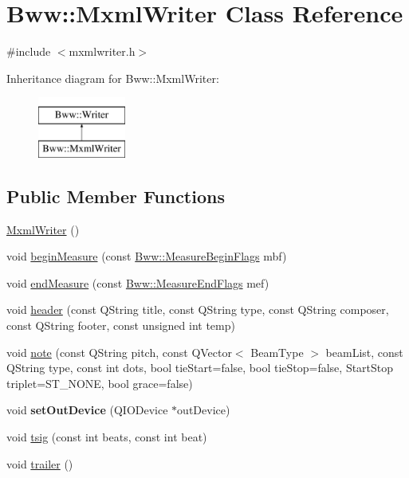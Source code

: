 \hypertarget{class_bww_1_1_mxml_writer}{}\section{Bww\+:\+:Mxml\+Writer Class Reference}
\label{class_bww_1_1_mxml_writer}


{\ttfamily \#include $<$mxmlwriter.\+h$>$}

Inheritance diagram for Bww\+:\+:Mxml\+Writer\+:\begin{figure}[H]
\begin{center}
\leavevmode
\includegraphics[height=2.000000cm]{class_bww_1_1_mxml_writer}
\end{center}
\end{figure}
\subsection*{Public Member Functions}
\begin{DoxyCompactItemize}
\item 
\hyperlink{class_bww_1_1_mxml_writer_ad37a20d16beb0ea1d91b7844ec0b8065}{Mxml\+Writer} ()
\item 
void \hyperlink{class_bww_1_1_mxml_writer_a344feb211f8ea206a599bad2a71f9320}{begin\+Measure} (const \hyperlink{struct_bww_1_1_measure_begin_flags}{Bww\+::\+Measure\+Begin\+Flags} mbf)
\item 
void \hyperlink{class_bww_1_1_mxml_writer_a75761179914135d570582cca240c3394}{end\+Measure} (const \hyperlink{struct_bww_1_1_measure_end_flags}{Bww\+::\+Measure\+End\+Flags} mef)
\item 
void \hyperlink{class_bww_1_1_mxml_writer_a427acc968936511567cb300633d99087}{header} (const Q\+String title, const Q\+String type, const Q\+String composer, const Q\+String footer, const unsigned int temp)
\item 
void \hyperlink{class_bww_1_1_mxml_writer_af0d0501ae75990d1272466ff82ce7d81}{note} (const Q\+String pitch, const Q\+Vector$<$ Beam\+Type $>$ beam\+List, const Q\+String type, const int dots, bool tie\+Start=false, bool tie\+Stop=false, Start\+Stop triplet=S\+T\+\_\+\+N\+O\+NE, bool grace=false)
\item 
\mbox{\label{class_bww_1_1_mxml_writer_a48ddae37209e371ec3583a1cf485c715}} 
void {\bfseries set\+Out\+Device} (Q\+I\+O\+Device $\ast$out\+Device)
\item 
void \hyperlink{class_bww_1_1_mxml_writer_a69142df07a037feead38ce59b19e89f4}{tsig} (const int beats, const int beat)
\item 
void \hyperlink{class_bww_1_1_mxml_writer_a2ad97b2e225efdf90482cf7615180746}{trailer} ()
\end{DoxyCompactItemize}


